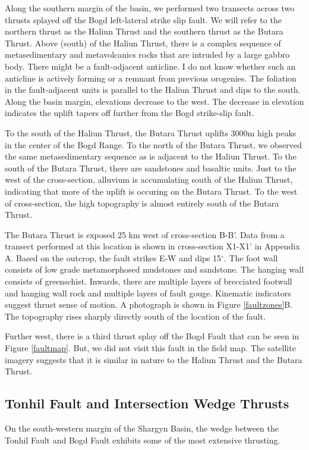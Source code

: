 Along the southern margin of the basin, we performed two transects across two thrusts splayed off the Bogd left-lateral strike slip fault. We will refer to the northern thrust as the Haliun Thrust and the southern thrust as the Butara Thrust. Above (south) of the Haliun Thrust, there is a complex sequence of metasedimentary and metavolcanics rocks that are intruded by a large gabbro body. There might be a fault-adjacent anticline. I do not know whether such an anticline is actively forming or a remnant from previous orogenies. The foliation in the fault-adjacent units is parallel to the Haliun Thrust and dips to the south. Along the basin margin, elevations decrease to the west. The decrease in elevation indicates the uplift tapers off further from the Bogd strike-slip fault. 

To the south of the Haliun Thrust, the Butara Thrust uplifts 3000m high peaks in the center of the Bogd Range. To the north of the Butara Thrust, we observed the same metasedimentary sequence as is adjacent to the Haliun Thrust. To the south of the Butara Thrust, there are sandstones and basaltic units. Just to the west of the cross-section, alluvium is accumulating south of the Haliun Thrust, indicating that more of the uplift is occuring on the Butara Thrust. To the west of cross-section, the high topography is almost entirely south of the Butara Thrust. 

The Butara Thrust is exposed 25 km west of cross-section B-B'. Data from a transect performed at this location is shown in cross-section X1-X1' in Appendix A. Based on the outcrop, the fault strikes E-W and dips 15$^{\circ}$. The foot wall consists of low grade metamorphosed mudstones and sandstone. The hanging wall consists of greenschist. Inwards, there are multiple layers of brecciated footwall and hanging wall rock and multiple layers of fault gouge. Kinematic indicators suggest thrust sense of motion. A photograph is shown in Figure \ref{faultzones}B. The topography rises sharply directly south of the location of the fault.

Further west, there is a third thrust splay off the Bogd Fault that can be seen in Figure \ref{faultmap}. But, we did not visit this fault in the field map. The satellite imagery suggests that it is similar in nature to the Haliun Thrust and the Butara Thrust.

\subsection{Tonhil Fault and Intersection Wedge Thrusts}
On the south-western margin of the Shargyn Basin, the wedge between the Tonhil Fault and Bogd Fault exhibits some of the most extensive thrusting. 

